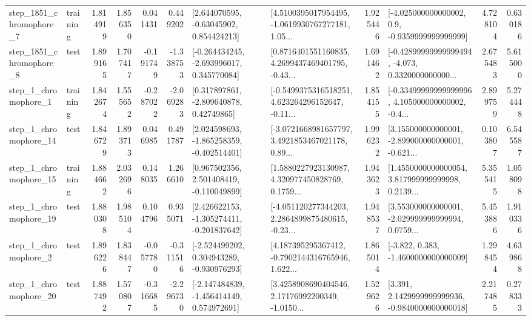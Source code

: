\begin{tabular}{llrrrrllrlrr}
  step\_1851\_chromophore\_7 &  training &      1.814919 &    1.856350 &      0.041431 &  0.449202 &     [2.644070595, -0.63045902, 0.854424213] &  [4.5100395017954495, -1.0619930767277181, 1.05... &       1.925446 &     [-4.025000000000002, 0.9, -0.9359999999999999] &            4.728104 &          0.630186 \\
  step\_1851\_chromophore\_8 &      test &      1.899165 &    1.707417 &     -0.191749 & -1.338753 &   [-0.264434245, -2.693996017, 0.345770084] &  [0.8716401551160835, 4.2699437469401795, -0.43... &       1.691462 &  [-0.42899999999999494, -4.073, 0.3320000000000... &            2.675483 &          5.615000 \\
     step\_1\_chromophore\_1 &  training &      1.842674 &    1.555652 &     -0.287022 & -2.069283 &     [0.317897861, -2.809640878, 0.42749865] &  [-0.5499375316518251, 4.623264296152647, -0.11... &       1.854155 &  [-0.33499999999999996, 4.105000000000002, -0.4... &            2.899759 &          5.274448 \\
    step\_1\_chromophore\_14 &      test &      1.846729 &    1.893713 &      0.046985 &  0.491787 &   [2.024598693, -1.865258359, -0.402514401] &  [-3.0721668981657797, 3.4921853467021178, 0.89... &       1.996232 &  [3.155000000000001, -2.899000000000001, -0.621... &            0.103807 &          6.545587 \\
    step\_1\_chromophore\_15 &  training &      1.884662 &    2.032696 &      0.148035 &  1.266610 &    [0.967502356, 2.501408419, -0.110049899] &  [1.5880227923130987, 4.320977450828769, 0.1759... &       1.943623 &  [1.4550000000000054, 3.817999999999998, 0.2139... &            5.355415 &          1.058098 \\
    step\_1\_chromophore\_19 &      test &      1.880308 &    1.985104 &      0.104796 &  0.935071 &   [2.426622153, -1.305274411, -0.201837642] &  [-4.051120277344203, 2.2864899875480615, -0.23... &       1.948537 &  [3.553000000000001, -2.029999999999994, 0.0759... &            5.453886 &          1.910336 \\
     step\_1\_chromophore\_2 &      test &      1.896226 &    1.838447 &     -0.057780 & -0.311516 &   [-2.524499202, 0.304943289, -0.930976293] &  [4.187395295367412, -0.7902144316765946, 1.622... &       1.865014 &               [-3.822, 0.383, -1.4600000000000009] &            1.298454 &          4.639868 \\
    step\_1\_chromophore\_20 &      test &      1.887492 &    1.570807 &     -0.316685 & -2.296730 &   [-2.147484839, -1.456414149, 0.574972691] &  [3.4258908690404546, 2.17176992200349, -1.0150... &       1.529626 &   [3.391, 2.1429999999999936, -0.9840000000000018] &            2.217485 &          0.278333 \\

\end{tabular}
